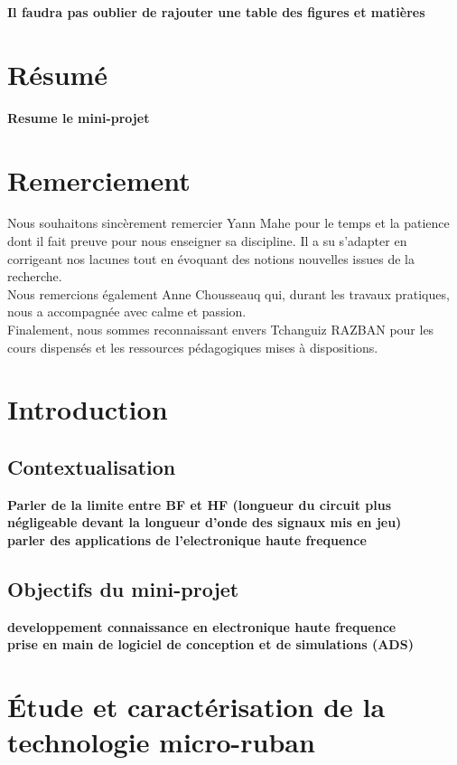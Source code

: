 \documentclass[french]{article}
\begin{document}
\newpage
\pagestyle{plain} %

\textbf{Il faudra pas oublier de rajouter une table des figures et matières}

\section{Résumé}
\textbf{Resume le mini-projet}

\section{Remerciement}
Nous souhaitons sincèrement remercier Yann Mahe pour le temps et la patience dont il fait preuve pour nous enseigner sa discipline. Il a su s'adapter en corrigeant nos lacunes tout en évoquant des notions nouvelles issues de la recherche. \\

Nous remercions également Anne Chousseauq qui, durant les travaux pratiques, nous a accompagnée avec calme et passion.\\

Finalement, nous sommes reconnaissant envers Tchanguiz RAZBAN pour les cours dispensés et  les ressources pédagogiques mises à dispositions.

\section{Introduction}
\subsection{Contextualisation}
\textbf{Parler de la limite entre BF et HF (longueur du circuit plus négligeable devant la longueur d'onde des signaux mis en jeu)\\
parler des applications de l'electronique haute frequence}
\subsection{Objectifs du mini-projet}
\textbf{developpement connaissance en electronique haute frequence\\
prise en main de logiciel de conception et de simulations (ADS)}

\newpage

\section{Étude et caractérisation de la technologie micro-ruban}
\end{document}
